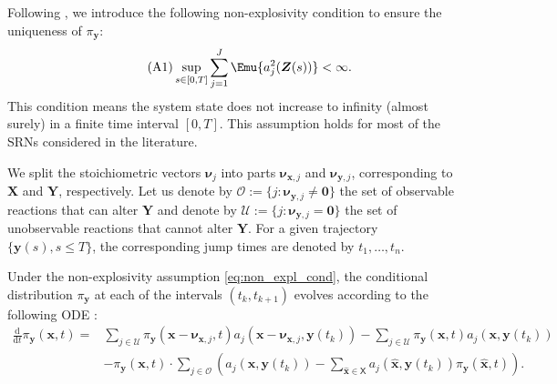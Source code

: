 Following \cite{DAmbrosio2022FFSP}, we introduce the following non-explosivity condition to ensure the uniqueness of $\pi_{\boldsymbol{y}}$:
\begin{equation}
\label{eq:non_expl_cond}
\tag{A1}
    \sup_{s \in [0, T]} \sum_{j=1}^{J} \Emu{a_j^2 (\boldsymbol{Z}(s))} < \infty.
\end{equation}
This condition means the system state does not increase to infinity (almost surely) in a finite time interval $[0, T]$. This assumption holds for most of the \acp{SRN} considered in the literature.




We split the stoichiometric vectors $\boldsymbol{\nu}_j$ into parts $\boldsymbol{\nu}_{\boldsymbol{x}, j}$ and $\boldsymbol{\nu}_{\boldsymbol{y}, j}$, corresponding to $\boldsymbol{X}$ and $\boldsymbol{Y}$, respectively. Let us denote by $\mathcal{O} := \{ j : \boldsymbol{\nu}_{\boldsymbol{y}, j} \neq \boldsymbol{0} \}$ the set of observable reactions that can alter $\boldsymbol{Y}$ and denote by $\mathcal{U} := \{ j : \boldsymbol{\nu}_{\boldsymbol{y}, j} = \boldsymbol{0} \}$ the set of unobservable reactions that cannot alter $\boldsymbol{Y}$. For a given trajectory $\{ \boldsymbol{y}(s), s \leq T \}$, the corresponding jump times are denoted by $t_1, \dots, t_n$.


Under the non-explosivity assumption \eqref{eq:non_expl_cond}, the conditional distribution $\pi_{\boldsymbol{y}}$ at each of the intervals $(t_k, t_{k+1})$ evolves according to the following \ac{ODE} \cite{DAmbrosio2022FFSP, Rathinam2021PFwithExactState}:
\begin{equation}
    \label{eq:filtering_equation_pi}
    \begin{aligned}
        \frac{\mathrm{d}}{\mathrm{d} t} \pi_{\boldsymbol{y}} (\boldsymbol{x}, t) = &\sum_{j \in \mathcal{U}} \pi_{\boldsymbol{y}} (\boldsymbol{x} - \boldsymbol{\nu}_{\boldsymbol{x}, j}, t) a_j \left( \boldsymbol{x} - \boldsymbol{\nu}_{\boldsymbol{x}, j}, \boldsymbol{y}(t_k) \right) - \sum_{j \in \mathcal{U}} \pi_{\boldsymbol{y}}(\boldsymbol{x}, t) a_j (\boldsymbol{x}, \boldsymbol{y}(t_k)) \\
        &- \pi_{\boldsymbol{y}} (\boldsymbol{x}, t) \cdot \sum_{j \in \mathcal{O}} \left( a_j (\boldsymbol{x}, \boldsymbol{y}(t_k)) -  \sum_{\hat{\boldsymbol{x}} \in \mathsf{X}} a_j (\hat{\boldsymbol{x}}, \boldsymbol{y}(t_k)) \pi_{\boldsymbol{y}} (\hat{\boldsymbol{x}}, t)\right).
    \end{aligned}
\end{equation}

